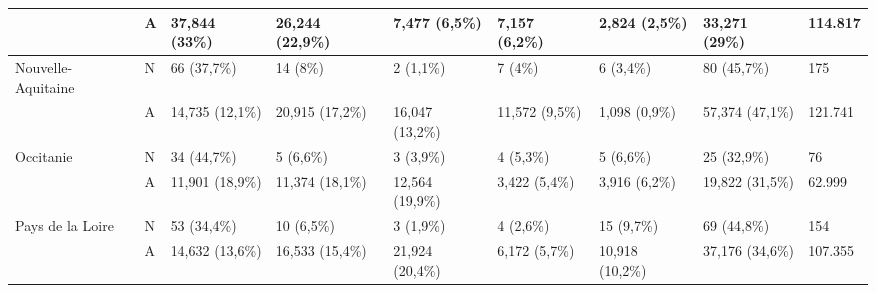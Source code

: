 \begin{table}[H]
{\begin{tabular}{|l|l|l|l|l|l|l|l|l|}
            ~                                                 & A               & 37,844 (33\%)                     & 26,244 (22,9\%) & 7,477 (6,5\%)    & 7,157 (6,2\%)
                                                              & 2,824 (2,5\%)   & 33,271 (29\%)                     & 114.817                                                                  \\ \hline
            Nouvelle-Aquitaine                                & N               & 66 (37,7\%)                       & 14 (8\%)        & 2 (1,1\%)        & 7 (4\%)        &
            6 (3,4\%)                                         & 80 (45,7\%)     & 175                                                                                                          \\
            ~                                                 & A               & 14,735 (12,1\%)                   & 20,915 (17,2\%) & 16,047 (13,2\%)  & 11,572
            (9,5\%)                                           & 1,098 (0,9\%)   & 57,374 (47,1\%)                   & 121.741                                                                  \\ \hline
            Occitanie                                         & N               & 34 (44,7\%)                       & 5 (6,6\%)       & 3 (3,9\%)        & 4 (5,3\%)      & 5
            (6,6\%)                                           & 25 (32,9\%)     & 76                                                                                                           \\
            ~                                                 & A               & 11,901 (18,9\%)                   & 11,374 (18,1\%) & 12,564 (19,9\%)  & 3,422
            (5,4\%)                                           & 3,916 (6,2\%)   & 19,822 (31,5\%)                   & 62.999                                                                   \\ \hline
            Pays de la Loire                                  & N               & 53 (34,4\%)                       & 10 (6,5\%)      & 3 (1,9\%)        & 4 (2,6\%)
                                                              & 15 (9,7\%)      & 69 (44,8\%)                       & 154                                                                      \\
            ~                                                 & A               & 14,632 (13,6\%)                   & 16,533 (15,4\%) & 21,924 (20,4\%)  & 6,172
            (5,7\%)                                           & 10,918 (10,2\%) & 37,176 (34,6\%)                   & 107.355                                                                  \\ \hline

\end{tabular}}
\end{table}
